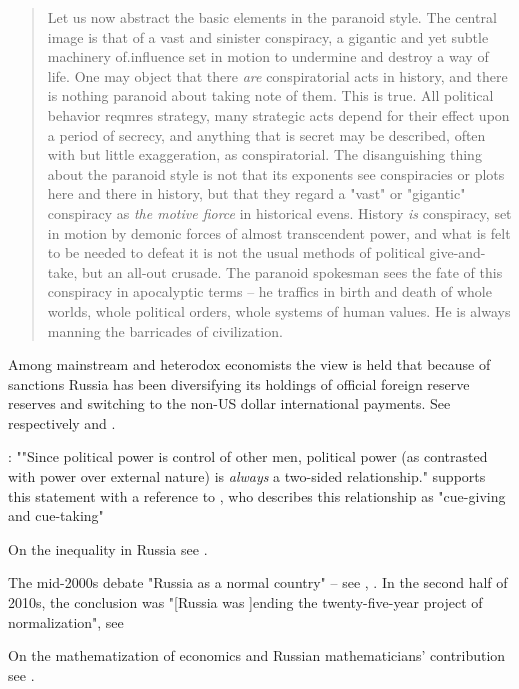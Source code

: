 \begin{quote}
Let us now abstract the basic elements in the paranoid style. 
The central image is that of a vast and sinister conspiracy, a gigantic and yet subtle machinery of.influence set in motion to undermine and destroy a way of life. One may object that there \textit{are} conspiratorial acts in history, and there is nothing paranoid about taking note of them. This is true. All political behavior reqmres strategy, many strategic acts depend for their effect upon a period of secrecy, and anything that is secret may be described, often with but little exaggeration, as conspiratorial. The disanguishing thing about the paranoid style is not that its exponents see conspiracies or plots here and there in history, but that they regard a "vast" or "gigantic" conspiracy as \textit{the motive fiorce} in historical evens. History \textit{is} conspiracy, set in motion by demonic forces of almost transcendent power, and what is felt to be needed to defeat it is not the usual methods of political give-and-take, but an all-out crusade. The paranoid spokesman sees the fate of this conspiracy in apocalyptic terms -- he traffics in birth and death of whole worlds, whole political orders, whole systems of human values. He is always manning the barricades of civilization. \citep[p.~525, emphasys original]{hofstadter2020}
\end{quote}

Among mainstream and heterodox economists the view is held that because of sanctions Russia has been diversifying its holdings of official foreign reserve reserves and switching to the non-US dollar international payments. See respectively \citep{mcdowell} and \citep{bracarense2022,bracarense2024}.

\citep[p.~3, emphasis added]{neumann1957}: ""Since political power is control of other men, political power (as contrasted with power over external nature) is \textit{always} a two-sided relationship." \citeauthor{neumann1957} supports this statement with a reference to \citep{lasswell1948}, who describes this relationship as "cue-giving and cue-taking"

On the inequality in Russia see \citep{remington2018}.

The mid-2000s debate "Russia as a normal country" -- see \citep{shleifer2005}, \citep{zhurav2007}. In the second half of 2010s, the conclusion was "[Russia was ]ending the twenty-five-year project of normalization", see \citep{medvedev2019}

On the mathematization of economics and Russian mathematicians' contribution see \citep{boldyrev2024}.

